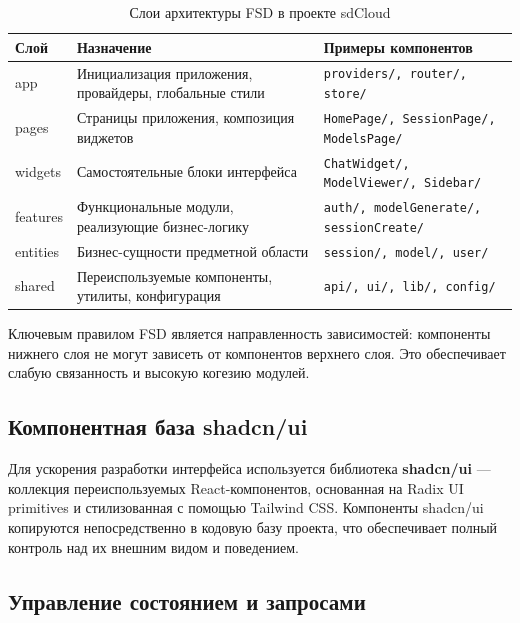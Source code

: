 \begin{table}[H]
    \centering
    \caption{Слои архитектуры FSD в проекте sdCloud}
    \label{tab:fsd-layers}
    \begin{tabular}{|p{3cm}|p{5cm}|p{5.5cm}|}
        \hline
        \textbf{Слой} & \textbf{Назначение} & \textbf{Примеры компонентов} \\
        \hline
        app & Инициализация приложения, провайдеры, глобальные стили & \texttt{providers/, router/, store/} \\
        \hline
        pages & Страницы приложения, композиция виджетов & \texttt{HomePage/, SessionPage/, ModelsPage/} \\
        \hline
        widgets & Самостоятельные блоки интерфейса & \texttt{ChatWidget/, ModelViewer/, Sidebar/} \\
        \hline
        features & Функциональные модули, реализующие бизнес-логику & \texttt{auth/, modelGenerate/, sessionCreate/} \\
        \hline
        entities & Бизнес-сущности предметной области & \texttt{session/, model/, user/} \\
        \hline
        shared & Переиспользуемые компоненты, утилиты, конфигурация & \texttt{api/, ui/, lib/, config/} \\
        \hline
    \end{tabular}
\end{table}

Ключевым правилом FSD является направленность зависимостей: компоненты нижнего слоя не могут зависеть от компонентов верхнего слоя. Это обеспечивает слабую связанность и высокую когезию модулей.

\subsection{Компонентная база shadcn/ui}

Для ускорения разработки интерфейса используется библиотека \textbf{shadcn/ui} \cite{shadcn2024} --- коллекция переиспользуемых React-компонентов, основанная на Radix UI primitives и стилизованная с помощью Tailwind CSS. Компоненты shadcn/ui копируются непосредственно в кодовую базу проекта, что обеспечивает полный контроль над их внешним видом и поведением.

\subsection{Управление состоянием и запросами}

